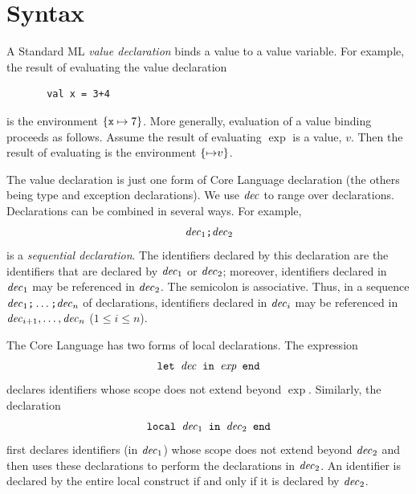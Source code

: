 \documentclass[12pt]{book}
\begin{document}
\section{Syntax}
A Standard ML  {\em value declaration} binds a value 
to a value variable. For example, the result of evaluating the value declaration
\begin{verbatim}
       val x = 3+4
\end{verbatim}
is the environment $\{\hbox{\tt x}\mapsto 7\}$. More generally,
evaluation of a value binding  proceeds
as follows. Assume the result of evaluating $\exp$ is a value, $v$.
Then the result of evaluating  is the
environment $\{{\it \mapsto} v\}$.

The value declaration is just one form of Core Language declaration 
(the others being type and exception declarations). We use ${\it dec}$ to
range over declarations. Declarations can be
combined in several ways. For example, 
$${\it dec}_1\hbox{\tt ;}{\it dec}_2$$
is a {\em sequential declaration}. The identifiers declared by this
declaration are the identifiers that are declared by ${\it dec}_1$ or ${\it dec}_2$;
moreover, identifiers declared in ${\it dec}_1$ may be referenced in ${\it dec}_2$.
The semicolon is associative. Thus, in a sequence 
${\it dec}_1\hbox{\tt ;}\ldots\hbox{\tt ;}{\it dec}_n$
of declarations, identifiers declared in 
${\it dec}_i$ may be referenced in ${\it dec}_{i+1},\ldots
,{\it dec}_n$ ($1\leq i\leq n$). 

The Core Language has two forms of local declarations. The
expression 
$$\hbox{\tt let ${\it dec}$ in $\hbox{\it exp}$ end}$$
declares identifiers whose scope does not extend beyond $\exp$. Similarly,
the declaration
$$\hbox{\tt local ${\it dec}_1$ in ${\it dec}_2$ end}$$
first declares identifiers (in ${\it dec}_1$) whose scope does not extend beyond
${\it dec}_2$ and then uses these declarations to perform the declarations in
${\it dec}_2$. An identifier is declared by the entire local construct if and only
if it is declared by ${\it dec}_2$.
\end{document}
